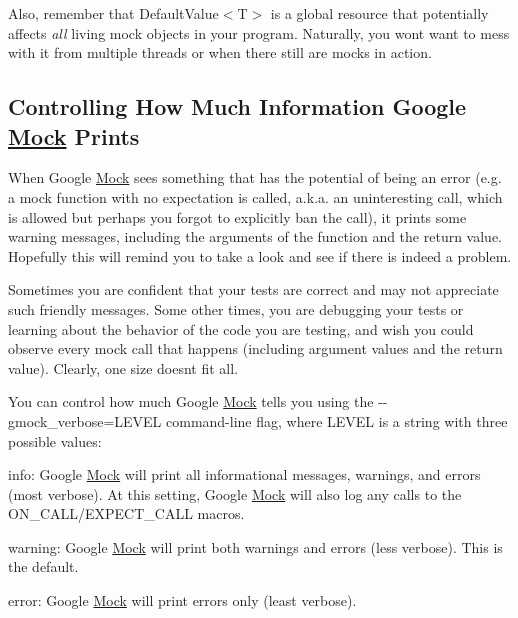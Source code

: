 Also, remember that {\ttfamily Default\+Value$<$T$>$} is a global resource that potentially affects {\itshape all} living mock objects in your program. Naturally, you won\textquotesingle{}t want to mess with it from multiple threads or when there still are mocks in action.

\subsection*{Controlling How Much Information Google \mbox{\hyperlink{class_mock}{Mock}} Prints}

When Google \mbox{\hyperlink{class_mock}{Mock}} sees something that has the potential of being an error (e.\+g. a mock function with no expectation is called, a.\+k.\+a. an uninteresting call, which is allowed but perhaps you forgot to explicitly ban the call), it prints some warning messages, including the arguments of the function and the return value. Hopefully this will remind you to take a look and see if there is indeed a problem.

Sometimes you are confident that your tests are correct and may not appreciate such friendly messages. Some other times, you are debugging your tests or learning about the behavior of the code you are testing, and wish you could observe every mock call that happens (including argument values and the return value). Clearly, one size doesn\textquotesingle{}t fit all.

You can control how much Google \mbox{\hyperlink{class_mock}{Mock}} tells you using the {\ttfamily -\/-\/gmock\+\_\+verbose=L\+E\+V\+EL} command-\/line flag, where {\ttfamily L\+E\+V\+EL} is a string with three possible values\+:


\begin{DoxyItemize}
\item {\ttfamily info}\+: Google \mbox{\hyperlink{class_mock}{Mock}} will print all informational messages, warnings, and errors (most verbose). At this setting, Google \mbox{\hyperlink{class_mock}{Mock}} will also log any calls to the {\ttfamily O\+N\+\_\+\+C\+A\+L\+L/\+E\+X\+P\+E\+C\+T\+\_\+\+C\+A\+LL} macros.
\item {\ttfamily warning}\+: Google \mbox{\hyperlink{class_mock}{Mock}} will print both warnings and errors (less verbose). This is the default.
\item {\ttfamily error}\+: Google \mbox{\hyperlink{class_mock}{Mock}} will print errors only (least verbose).
\end{DoxyItemize}

